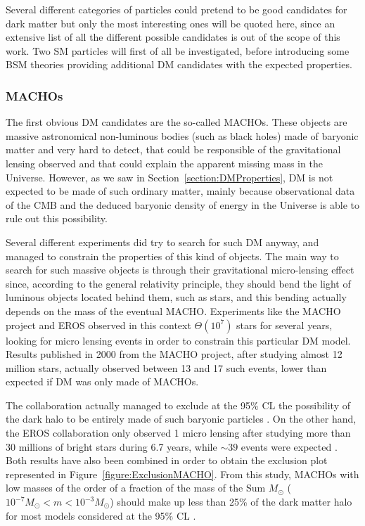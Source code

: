 \documentclass[a4paper, 10pt, openright]{report}
\begin{document}
Several different categories of particles could pretend to be good candidates for dark matter but only the most interesting ones will be quoted here, since an extensive list of all the different possible candidates is out of the scope of this work. Two \ac{SM} particles will first of all be investigated, before introducing some \ac{BSM} theories providing additional \ac{DM} candidates with the expected properties.

\subsubsection*{\acfp{MACHO}}
The first obvious \ac{DM} candidates are the so-called \acp{MACHO}. These objects are massive astronomical non-luminous bodies (such as black holes) made of baryonic matter and very hard to detect, that could be responsible of the gravitational lensing observed and that could explain the apparent missing mass in the Universe. However, as we saw in Section~\ref{section:DMProperties}, \ac{DM} is not expected to be made of such ordinary matter, mainly because observational data of the \ac{CMB} and the deduced baryonic density of energy in the Universe is able to rule out this possibility.

Several different experiments did try to search for such \ac{DM} anyway, and managed to constrain the properties of this kind of objects. The main way to search for such massive objects is through their gravitational micro-lensing effect since, according to the general relativity principle, they should bend the light of luminous objects located behind them, such as stars, and this bending actually depends on the mass of the eventual \ac{MACHO}. Experiments like the \ac{MACHO} project and EROS observed in this context $\Theta (10^7)$ stars for several years, looking for micro lensing events in order to constrain this particular \ac{DM} model. Results published in 2000 from the MACHO project, after studying almost 12 million stars, actually observed between 13 and 17 such events, lower than expected if \ac{DM} was only made of \acp{MACHO}. 

The collaboration actually managed to exclude at the 95\% \ac{CL} the possibility of the dark halo to be entirely made of such baryonic particles \cite{MACHOProject}. On the other hand, the EROS collaboration only observed 1 micro lensing after studying more than 30 millions of bright stars during 6.7 years, while $\sim39$ events were expected \cite{EROS}. Both results have also been combined in order to obtain the exclusion plot represented in Figure~\ref{figure:ExclusionMACHO}. From this study, \acp{MACHO} with low masses of the order of a fraction of the mass of the Sum $M_\odot$ ($10^{-7}M_\odot < m < 10^{-3}M_\odot$) should make up less than 25\% of the dark matter halo for most models considered at the 95\% \ac{CL} \cite{ExclusionMACHO}.
\end{document}
